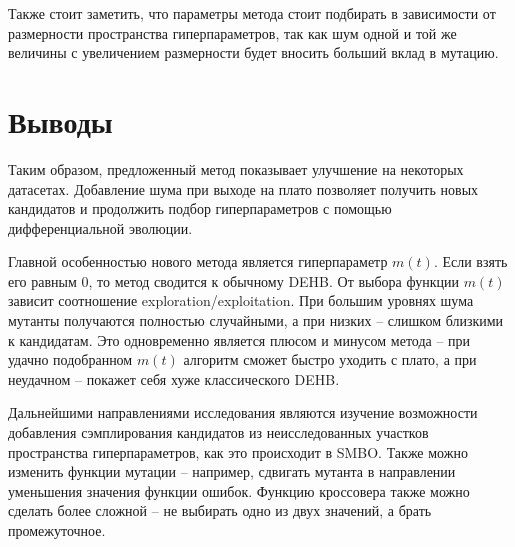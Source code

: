 \documentclass[a4paper,12pt]{article}
\begin{document}
Также стоит заметить, что параметры метода стоит подбирать в зависимости от размерности пространства гиперпараметров, так как шум одной и той же величины с увеличением размерности будет вносить больший вклад в мутацию.

\section{Выводы}
Таким образом, предложенный метод показывает улучшение на некоторых датасетах. Добавление шума при выходе на плато позволяет получить новых кандидатов и продолжить подбор гиперпараметров с помощью дифференциальной эволюции.

Главной особенностью нового метода является гиперпараметр $m(t)$. Если взять его равным 0, то метод сводится к обычному DEHB. От выбора функции $m(t)$ зависит соотношение exploration/exploitation. При большим уровнях шума мутанты получаются полностью случайными, а при низких -- слишком близкими к кандидатам. Это одновременно является плюсом и минусом метода -- при удачно подобранном $m(t)$ алгоритм сможет быстро уходить с плато, а при неудачном -- покажет себя хуже классического DEHB.

Дальнейшими направлениями исследования являются изучение возможности добавления сэмплирования кандидатов из неисследованных участков пространства гиперпараметров, как это происходит в SMBO. Также можно изменить функции мутации -- например, сдвигать мутанта в направлении уменьшения значения функции ошибок. Функцию кроссовера также можно сделать более сложной -- не выбирать одно из двух значений, а брать промежуточное.


% 
% 
\end{document}
